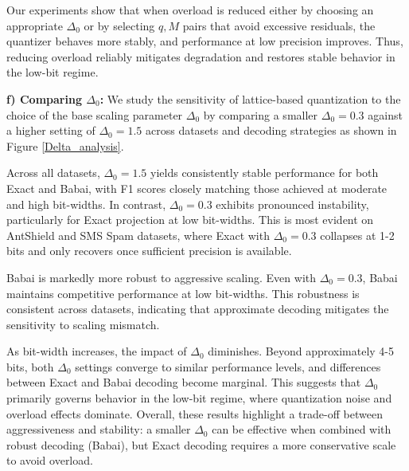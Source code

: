 \documentclass{article}
\theoremstyle{definition}
\theoremstyle{remark}
\begin{document}
Our experiments show that when overload is reduced either by choosing an appropriate $\Delta_{0}$ or by selecting $q,M$ pairs that avoid excessive residuals, the quantizer behaves more stably, and performance at low precision improves. Thus, reducing overload reliably mitigates degradation and restores stable behavior in the low-bit regime.

\textbf{f) Comparing $\Delta_0$: }
We study the sensitivity of lattice-based quantization to the choice of the base scaling parameter $\Delta_0$ by comparing a smaller $\Delta_0=0.3$ against a higher setting of $\Delta_0=1.5$ across datasets and decoding strategies as shown in Figure \ref{Delta_analysis}.

Across all datasets, $\Delta_0=1.5$ yields consistently stable performance for both Exact and Babai, with F1 scores closely matching those achieved at moderate and high bit-widths. In contrast, $\Delta_0=0.3$ exhibits pronounced instability, particularly for Exact projection at low bit-widths. This is most evident on AntShield and SMS Spam datasets, where Exact with $\Delta_0=0.3$ collapses at 1-2 bits and only recovers once sufficient precision is available.

Babai is markedly more robust to aggressive scaling. Even with $\Delta_0=0.3$, Babai maintains competitive performance at low bit-widths. This robustness is consistent across datasets, indicating that approximate decoding mitigates the sensitivity to scaling mismatch.

As bit-width increases, the impact of $\Delta_0$ diminishes. Beyond approximately 4-5 bits, both $\Delta_0$ settings converge to similar performance levels, and differences between Exact and Babai decoding become marginal. This suggests that $\Delta_0$ primarily governs behavior in the low-bit regime, where quantization noise and overload effects dominate. Overall, these results highlight a trade-off between aggressiveness and stability: a smaller $\Delta_0$ can be effective when combined with robust decoding (Babai), but Exact decoding requires a more conservative scale to avoid overload.
\end{document}
